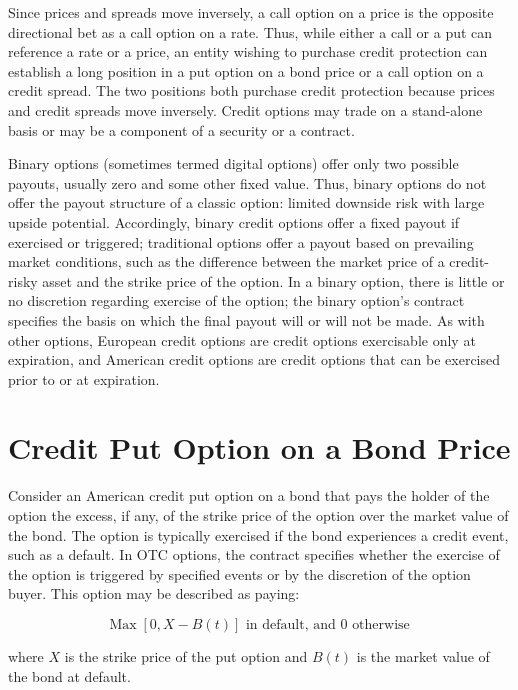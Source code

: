 \documentclass[11pt]{article}
\begin{document}
Since prices and spreads move inversely, a call option on a price is the opposite directional bet as a call option on a rate. Thus, while either a call or a put can reference a rate or a price, an entity wishing to purchase credit protection can establish a long position in a put option on a bond price or a call option on a credit spread. The two positions both purchase credit protection because prices and credit spreads move inversely. Credit options may trade on a stand-alone basis or may be a component of a security or a contract.

Binary options (sometimes termed digital options) offer only two possible payouts, usually zero and some other fixed value. Thus, binary options do not offer the payout structure of a classic option: limited downside risk with large upside potential. Accordingly, binary credit options offer a fixed payout if exercised or triggered; traditional options offer a payout based on prevailing market conditions, such as the difference between the market price of a credit-risky asset and the strike price of the option. In a binary option, there is little or no discretion regarding exercise of the option; the binary option's contract specifies the basis on which the final payout will or will not be made. As with other options, European credit options are credit options exercisable only at expiration, and American credit options are credit options that can be exercised prior to or at expiration.

\section*{Credit Put Option on a Bond Price}
Consider an American credit put option on a bond that pays the holder of the option the excess, if any, of the strike price of the option over the market value of the bond. The option is typically exercised if the bond experiences a credit event, such as a default. In OTC options, the contract specifies whether the exercise of the option is triggered by specified events or by the discretion of the option buyer. This option may be described as paying:


\begin{equation*}
\operatorname{Max}[0, X-B(t)] \text { in default, and } 0 \text { otherwise } \tag{1}
\end{equation*}


where $X$ is the strike price of the put option and $B(t)$ is the market value of the bond at default.
\end{document}
